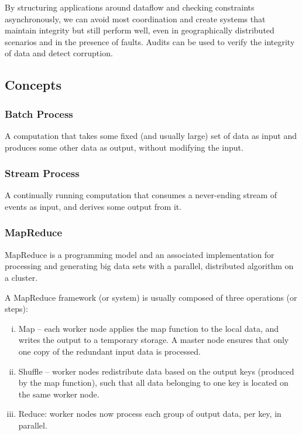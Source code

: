 \documentclass{article}
\begin{document}
    By structuring applications around dataflow and checking constraints asynchronously, we can avoid most coordination and create systems that maintain integrity but still perform well, even in geographically distributed scenarios and in the presence of faults. Audits can be used to verify the integrity of data and detect corruption.

    \subsection{Concepts}
    
    \subsubsection{Batch Process}
    A computation that takes some fixed (and usually large) set of data as input and produces some other data as output, without modifying the input.
    
    \subsubsection{Stream Process}
    A continually running computation that consumes a never-ending stream of events as input, and derives some output from it.
    
    \subsubsection{MapReduce}
    MapReduce is a programming model and an associated implementation for processing and generating big data sets with a parallel, distributed algorithm on a cluster.
    
    A MapReduce framework (or system) is usually composed of three operations (or steps):
    \begin{enumerate}[i.]
        \item Map -- each worker node applies the map function to the local data, and writes the output to a temporary storage. A master node ensures that only one copy of the redundant input data is processed.
        \item Shuffle -- worker nodes redistribute data based on the output keys (produced by the map function), such that all data belonging to one key is located on the same worker node.
        \item Reduce: worker nodes now process each group of output data, per key, in parallel.
    \end{enumerate}
    
\end{document}
